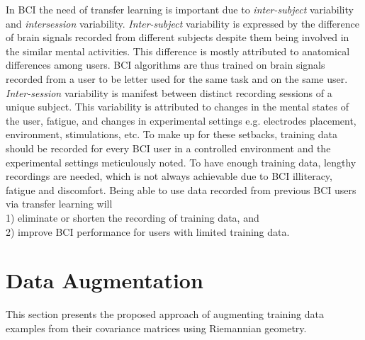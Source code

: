 In BCI the need of transfer learning is important due to \textit{inter-subject} variability and \textit{intersession} variability. 
\emph{Inter-subject} variability is expressed by the difference of brain signals recorded from different subjects despite them being involved in the similar mental activities. This difference is mostly attributed to anatomical differences among users. 
BCI algorithms are thus trained on brain signals recorded from a user to be letter used for the same task and on the same user.
\emph{Inter-session} variability is manifest between distinct recording sessions of a unique subject. 
This variability is attributed to changes in the mental states of the user, fatigue, and changes in experimental settings e.g. electrodes placement, environment, stimulations, etc.
To make up for these setbacks, training data should be recorded for every BCI user in a controlled environment and the experimental settings meticulously noted. 
To have enough training data, lengthy recordings are needed, which is not always achievable due to BCI illiteracy, fatigue and discomfort.  
Being able to use data recorded from previous BCI users via transfer learning will \\1) eliminate or shorten the recording of training data, and \\2) improve BCI performance for users with limited training data. 
 
\section{Data Augmentation}
\label{sec:data-aug}

This section presents the proposed approach of augmenting training data examples from their covariance matrices using Riemannian geometry. 

